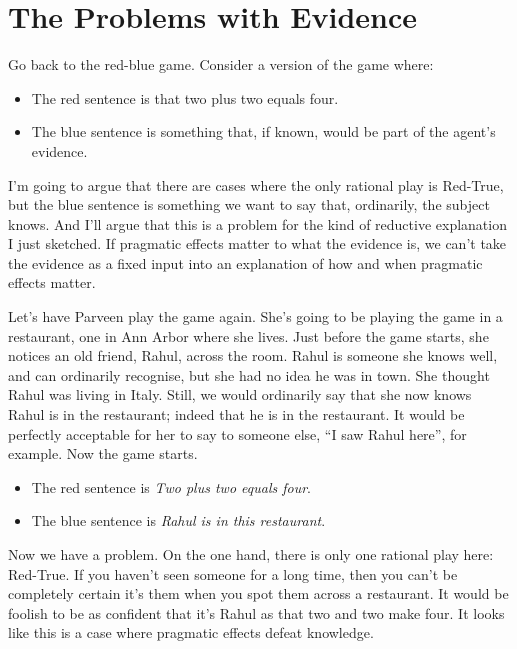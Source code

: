 \documentclass{article}
\begin{document}
\section{The Problems with Evidence}
\label{theproblemswithevidence}

Go back to the red-blue game. Consider a version of the game where:

\begin{itemize}
\item The red sentence is that two plus two equals four.

\item The blue sentence is something that, if known, would be part of the agent's evidence.

\end{itemize}
I'm going to argue that there are cases where the only rational play is Red-True, but the blue sentence is something we want to say that, ordinarily, the subject knows. And I'll argue that this is a problem for the kind of reductive explanation I just sketched. If pragmatic effects matter to what the evidence is, we can't take the evidence as a fixed input into an explanation of how and when pragmatic effects matter. 

Let's have Parveen play the game again. She's going to be playing the game in a restaurant, one in Ann Arbor where she lives. Just before the game starts, she notices an old friend, Rahul, across the room. Rahul is someone she knows well, and can ordinarily recognise, but she had no idea he was in town. She thought Rahul was living in Italy. Still, we would ordinarily say that she now knows Rahul is in the restaurant; indeed that he is in the restaurant. It would be perfectly acceptable for her to say to someone else, ``I saw Rahul here'', for example. Now the game starts.

\begin{itemize}
\item The red sentence is \emph{Two plus two equals four}.

\item The blue sentence is \emph{Rahul is in this restaurant}.

\end{itemize}
Now we have a problem. On the one hand, there is only one rational play here: Red-True. If you haven't seen someone for a long time, then you can't be completely certain it's them when you spot them across a restaurant. It would be foolish to be as confident that it's Rahul as that two and two make four. It looks like this is a case where pragmatic effects defeat knowledge.
\end{document}
